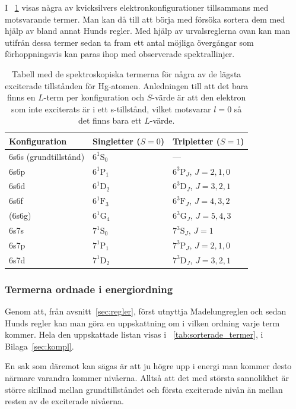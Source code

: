 \documentclass[11pt,a4paper]{article}
\newcommand{\tabref}{\tablename~\ref} %
\begin{document}
I \tabref{tab:Hg_termer} visas några av kvicksilvers
elektronkonfigurationer tillsammans med motsvarande termer. Man kan då
till att börja med försöka sortera dem med hjälp av bland annat Hunds
regler. 
Med hjälp av urvalsreglerna ovan kan man utifrån dessa termer sedan 
ta fram ett antal möjliga övergångar som förhoppningsvis kan paras ihop
med observerade spektrallinjer. 

\begin{table}
\centering
\caption{Tabell med de spektroskopiska termerna för några av de lägsta
exciterade tillstånden för Hg-atomen. Anledningen till att det bara
finns en $L$-term per konfiguration och $S$-värde är att den elektron
som inte exciterats är i ett s-tillstånd, vilket motsvarar $l=0$ så
det finns bara ett $L$-värde. }
\label{tab:Hg_termer}
\begin{tabular}{|l|l|l|}\hline
Konfiguration & Singletter ($S=0$) & Tripletter ($S=1$)
\\ \hline\hline
6s6s (grundtillstånd) & $6^1\mathrm{S}_0$ & --- \\ 
\hline
6s6p & $6^1\mathrm{P}_1$ & $6^3\mathrm{P}_J$, $J=2, 1, 0$ \\
6s6d & $6^1\mathrm{D}_2$ & $6^3\mathrm{D}_J$, $J=3, 2, 1$ \\
6s6f & $6^1\mathrm{F}_3$ & $6^3\mathrm{F}_J$, $J=4, 3, 2$ \\
(6s6g) & $6^1\mathrm{G}_4$ & $6^3\mathrm{G}_J$, $J=5, 4, 3$ \\
\hline
6s7s & $7^1\mathrm{S}_0$ & $7^3\mathrm{S}_J$, $J=1$ \\
6s7p & $7^1\mathrm{P}_1$ & $7^3\mathrm{P}_J$, $J=2, 1, 0$ \\
6s7d & $7^1\mathrm{D}_2$ & $7^3\mathrm{D}_J$, $J=3, 2, 1$ \\ 
\hline

\end{tabular}
\end{table}

\subsubsection{Termerna ordnade i energiordning}
Genom att, från avsnitt~\ref{sec:regler}, först utnyttja
Madelungreglen och sedan Hunds regler kan man göra en uppskattning om
i vilken ordning varje term kommer. Hela den uppskattade listan visas
i \tabref{tab:sorterade_termer}, i Bilaga~\ref{sec:kompl}.

En sak som däremot kan sägas är att ju högre upp i energi man kommer
desto närmare varandra kommer nivåerna. Alltså att det med största
sannolikhet är större skillnad mellan grundtillståndet och första
exciterade nivån än mellan resten av de exciterade nivåerna. 
\end{document}
